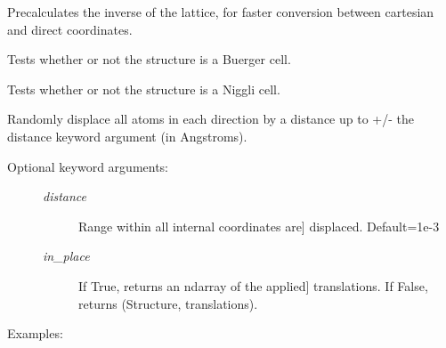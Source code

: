 \documentclass[letterpaper,10pt,english]{sphinxmanual}
\begin{document}
\begin{fulllineitems}
\begin{fulllineitems}
\label{models:qmpy.Structure.inv}
Precalculates the inverse of the lattice, for faster conversion
between cartesian and direct coordinates.

\end{fulllineitems}


\begin{fulllineitems}
\label{models:qmpy.Structure.is_buerger_cell}
Tests whether or not the structure is a Buerger cell.

\end{fulllineitems}


\begin{fulllineitems}
\label{models:qmpy.Structure.is_niggli_cell}
Tests whether or not the structure is a Niggli cell.

\end{fulllineitems}


\begin{fulllineitems}
\label{models:qmpy.Structure.joggle_atoms}
Randomly displace all atoms in each direction by a distance up to +/- the
distance keyword argument (in Angstroms).
\begin{description}
\item[{Optional keyword arguments:}] \leavevmode\begin{description}
\item[{\emph{distance}}] \leavevmode{[}Range within all internal coordinates are{]}
displaced. Default=1e-3

\item[{\emph{in\_place}}] \leavevmode{[}If True, returns an ndarray of the applied{]}
translations. If False, returns (Structure,
translations).

\end{description}

\end{description}

Examples:


\end{fulllineitems}
\end{fulllineitems}
\end{document}
